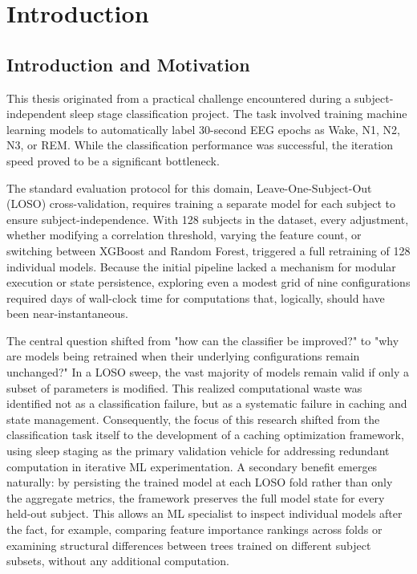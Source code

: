 
\chapter{Introduction}

\section{Introduction and Motivation}

This thesis originated from a practical challenge encountered during a subject-independent sleep stage classification project. The task involved training machine learning models to automatically label 30-second EEG epochs as Wake, N1, N2, N3, or REM. While the classification performance was successful, the iteration speed proved to be a significant bottleneck.

The standard evaluation protocol for this domain, Leave-One-Subject-Out (LOSO) cross-validation, requires training a separate model for each subject to ensure subject-independence. With 128 subjects in the dataset, every adjustment, whether modifying a correlation threshold, varying the feature count, or switching between XGBoost and Random Forest, triggered a full retraining of 128 individual models. Because the initial pipeline lacked a mechanism for modular execution or state persistence, exploring even a modest grid of nine configurations required days of wall-clock time for computations that, logically, should have been near-instantaneous.

The central question shifted from "how can the classifier be improved?" to "why are models being retrained when their underlying configurations remain unchanged?" In a LOSO sweep, the vast majority of models remain valid if only a subset of parameters is modified. This realized computational waste was identified not as a classification failure, but as a systematic failure in caching and state management. Consequently, the focus of this research shifted from the classification task itself to the development of a caching optimization framework, using sleep staging as the primary validation vehicle for addressing redundant computation in iterative ML experimentation. A secondary benefit emerges naturally: by persisting the trained model at each LOSO fold rather than only the aggregate metrics, the framework preserves the full model state for every held-out subject. This allows an ML specialist to inspect individual models after the fact, for example, comparing feature importance rankings across folds or examining structural differences between trees trained on different subject subsets, without any additional computation.

